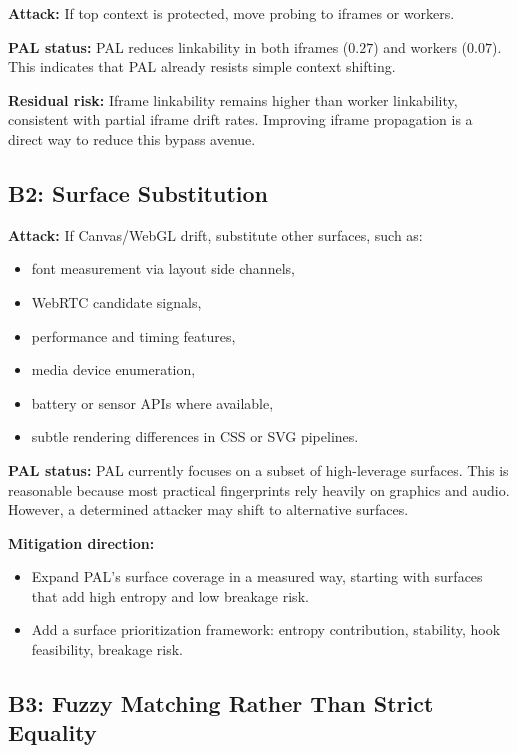 \documentclass[11pt]{report}
\begin{document}
\textbf{Attack:} If top context is protected, move probing to iframes or workers.

\textbf{PAL status:} PAL reduces linkability in both iframes ($0.27$) and workers ($0.07$). This indicates that PAL already resists simple context shifting.

\textbf{Residual risk:} Iframe linkability remains higher than worker linkability, consistent with partial iframe drift rates. Improving iframe propagation is a direct way to reduce this bypass avenue.

\subsection{B2: Surface Substitution}

\textbf{Attack:} If Canvas/WebGL drift, substitute other surfaces, such as:

\begin{itemize}
    \item font measurement via layout side channels,
    \item WebRTC candidate signals,
    \item performance and timing features,
    \item media device enumeration,
    \item battery or sensor APIs where available,
    \item subtle rendering differences in CSS or SVG pipelines.
\end{itemize}

\textbf{PAL status:} PAL currently focuses on a subset of high-leverage surfaces. This is reasonable because most practical fingerprints rely heavily on graphics and audio. However, a determined attacker may shift to alternative surfaces.

\textbf{Mitigation direction:}
\begin{itemize}
    \item Expand PAL’s surface coverage in a measured way, starting with surfaces that add high entropy and low breakage risk.
    \item Add a surface prioritization framework: entropy contribution, stability, hook feasibility, breakage risk.
\end{itemize}

\subsection{B3: Fuzzy Matching Rather Than Strict Equality}
\end{document}
